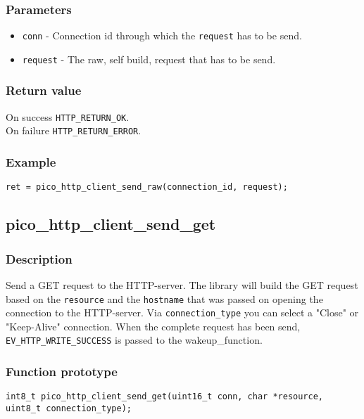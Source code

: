 \subsubsection*{Parameters}
\begin{itemize}[noitemsep]
\item \texttt{conn} - Connection id through which the \texttt{request} has to be send.
\item \texttt{request} - The raw, self build, request that has to be send.
\end{itemize}

\subsubsection*{Return value}
On success \texttt{HTTP\_RETURN\_OK}.
\\On failure \texttt{HTTP\_RETURN\_ERROR}.

\subsubsection*{Example}
\begin{verbatim}
ret = pico_http_client_send_raw(connection_id, request);
\end{verbatim}


\subsection{pico\_http\_client\_send\_get}
\subsubsection*{Description}
Send a GET request to the HTTP-server. The library will build the GET request based on the \texttt{resource} and the \texttt{hostname} that was passed on opening the connection to the HTTP-server. Via \texttt{connection\_type} you can select a "Close" or "Keep-Alive" connection. When the complete request has been send, \texttt{EV\_HTTP\_WRITE\_SUCCESS} is passed to the wakeup\_function.

\subsubsection*{Function prototype}
\texttt{int8\_t pico\_http\_client\_send\_get(uint16\_t conn, char *resource, uint8\_t connection\_type);}

